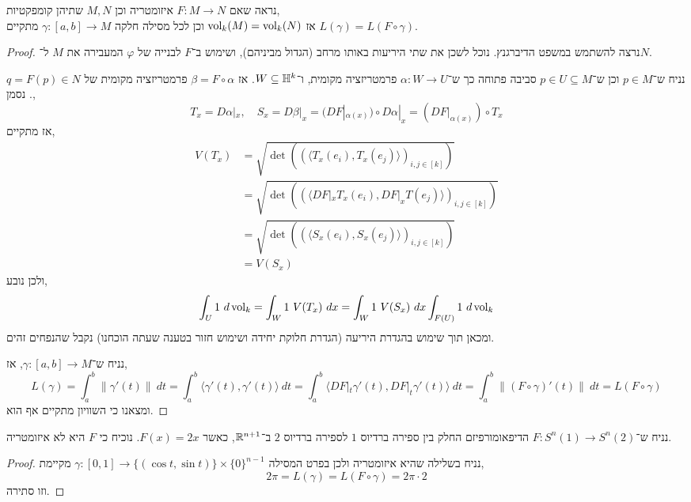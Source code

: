 \subquestion{}
נראה שאם $F : M \to N$ איזומטריה וכן $M, N$ שתיהן קומפקטיות, \\
אז $\operatorname{vol}_k(M) = \operatorname{vol}_k(N)$ וכן לכל מסילה חלקה $\gamma : [a, b] \to M$ מתקיים $L(\gamma) = L(F \circ \gamma)$.
\begin{proof}
	נרצה להשתמש במשפט הדיברגנץ.
	נוכל לשכן את שתי היריעות באותו מרחב (הגדול מביניהם), ושימוש ב־$F$ לבנייה של $\varphi$ המעבירה את $M$ ל־$N$.

	נניח ש־$p \in M$ וכן ש־$p \in U \subseteq M$ סביבה פתוחה כך ש־$\alpha : W \to U$ פרמטריזציה מקומית, ו־$W \subseteq \mathbb{H}^k$.
	אז $\beta = F \circ \alpha$ פרמטריזציה מקומית של $q = F(p) \in N$.
	נסמן,
	\[
		T_x = D \alpha |_x,
		\quad
		S_x
		= D \beta |_x
		= (D F |_{\alpha(x)}) \circ D \alpha |_x
		= (D F |_{\alpha(x)}) \circ T_x
	\]
	אז מתקיים,
	\begin{align*}
		V(T_x)
		& = \sqrt{\det\left({(\langle T_x(e_i), T_x(e_j) \rangle)}_{i, j \in [k]}\right)} \\
		& = \sqrt{\det\left({(\langle D F |_x T_x(e_i), D F |_x T(e_j) \rangle)}_{i, j \in [k]}\right)} \\
		& = \sqrt{\det\left({(\langle S_x(e_i), S_x(e_j) \rangle)}_{i, j \in [k]}\right)} \\
		& = V(S_x)
	\end{align*}
	ולכן נובע,
	\[
		\int_U 1\ d\operatorname{vol}_k
		= \int_{W} 1\ V(T_x)\ dx
		= \int_{W} 1\ V(S_x)\ dx
		\int_{F(U)} 1\ d\operatorname{vol}_k
	\]
	ומכאן תוך שימוש בהגדרת היריעה (הגדרת חלוקת יחידה ושימוש חזור בטענה שעתה הוכחנו) נקבל שהנפחים זהים.

	נניח ש־$\gamma : [a, b] \to M$, אז,
	\[
		L(\gamma)
		= \int_{a}^{b} \lVert \gamma'(t) \rVert\ dt
		= \int_{a}^{b} \langle \gamma'(t), \gamma'(t) \rangle\ dt
		= \int_{a}^{b} \langle D F |_t \gamma'(t), D F |_t \gamma'(t) \rangle\ dt
		= \int_{a}^{b} \lVert (F \circ \gamma)'(t) \rVert\ dt
		= L(F \circ \gamma)
	\]
	ומצאנו כי השוויון מתקיים אף הוא.
\end{proof}

\subquestion{}
נניח ש־$F : S^n(1) \to S^n(2)$ הדיפאומורפיזם החלק בין ספירה ברדיוס $1$ לספירה ברדיוס $2$ ב־$\mathbb{R}^{n + 1}$, כאשר $F(x) = 2x$.
נוכיח כי $F$ היא לא איזומטריה.
\begin{proof}
	נניח בשלילה שהיא איזומטריה ולכן בפרט המסילה $\gamma : [0, 1] \to \{ (\cos t, \sin t) \} \times {\{ 0 \}}^{n - 1}$ מקיימת,
	\[
		2 \pi
		= L(\gamma)
		= L(F \circ \gamma)
		= 2 \pi \cdot 2
	\]
	וזו סתירה.
\end{proof}

